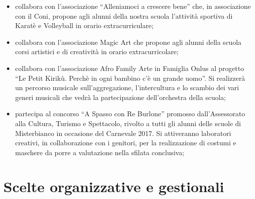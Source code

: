 \documentclass[12pt,a4paper,oneside]{memoir}
\begin{document}
\begin{itemize}
   \item collabora con l'associazione ``Alleniamoci a crescere bene'' che, in associazione con il Coni, propone agli alunni della nostra scuola l'attività sportiva di Karatè e Volleyball in orario extracurriculare; 
   \item collabora con l'associazione Magic Art che propone agli alunni della scuola corsi artistici e di creatività in orario extracurricolare; 
   \item collabora con l'associazione Afro Family Arte in Famiglia Onlus al progetto ``Le Petit Kirikù. Perchè in ogni bambino c’è un grande uomo''. Si realizzerà un percorso musicale sull'aggregazione, l'intercultura e lo scambio dei vari generi musicali che vedrà la partecipazione dell’orchestra della scuola; 
   \item partecipa al concorso ``A Spasso con Re Burlone'' promosso dall'Assessorato alla Cultura, Turismo e Spettacolo, rivolto a tutti gli alunni delle scuole di Misterbianco in occasione del Carnevale 2017. Si attiveranno laboratori creativi, in collaborazione con i genitori, per la realizzazione di costumi e maschere da porre a valutazione nella sfilata conclusiva; 
   \end{itemize}
   
   \chapter[Scelte organizzative e gestionali]{Scelte organizzative e gestionali}
\end{document}
